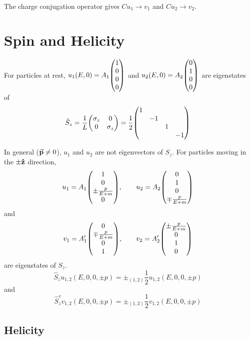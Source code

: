 \documentclass[a4paper,twoside,master.tex]{subfiles}
\begin{document}
The charge conjugation operator gives $ C u_1 \to v_1 $ and $ C u_2 \to v_2 $.

\section{Spin and Helicity}\label{sec:spin_and_helicity}

For particles at rest, $ u_1(E, 0) = A_1 \mqty(1\\0\\0\\0) $ and $ u_2(E, 0) = A_2 \mqty(0\\1\\0\\0) $ are eigenstates of
\begin{equation}
    \hat{S}_z = \frac{1}{L} \mqty(\sigma_z & 0\\0 & \sigma_z) = \frac{1}{2} \mqty(\dmat{1,-1,1,-1})
\end{equation}

In general ($ \va{p} \neq 0 $), $ u_1 $ and $ u_2 $ are not eigenvectors of $ S_z $. For particles moving in the $ \pm \vu{z} $ direction,
\begin{equation}
    u_1 = A_1 \mqty(1\\0\\\pm \frac{p}{E+m}\\0), \qquad u_2 = A_2 \mqty(0\\1\\0\\\mp \frac{p}{E+m})
\end{equation}
and
\begin{equation}
    v_1 = A_1' \mqty(0\\\mp \frac{p}{E+m}\\0\\1),\qquad v_2 = A_2' \mqty(\pm \frac{p}{E + m}\\0\\1\\0)
\end{equation}
are eigenstates of $ S_z $.
\begin{equation}
    \hat{S}_z u_{1,2}(E,0,0,\pm p) = \pm_{(1,2)} \frac{1}{2} u_{1,2}(E,0,0,\pm p)
\end{equation}
and
\begin{equation}
    \hat{S}_z^{v} v_{1,2}(E,0,0,\pm p) = \pm_{(1,2)} \frac{1}{2} v_{1,2}(E,0,0,\pm p)
\end{equation}

\subsection{Helicity}\label{sub:helicity}
\end{document}
